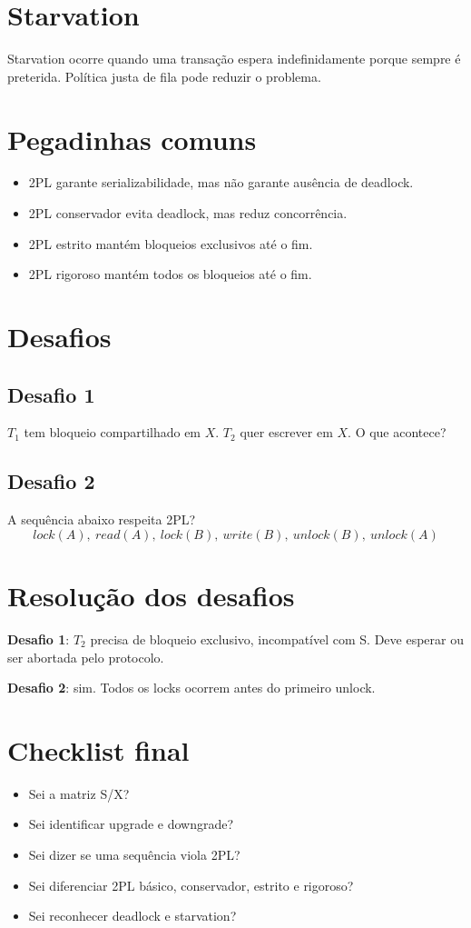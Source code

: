 \documentclass[12pt,a4paper]{article}
\begin{document}
\section{Starvation}
Starvation ocorre quando uma transação espera indefinidamente porque sempre é preterida. Política justa de fila pode reduzir o problema.

\section{Pegadinhas comuns}
\begin{itemize}
    \item 2PL garante serializabilidade, mas não garante ausência de deadlock.
    \item 2PL conservador evita deadlock, mas reduz concorrência.
    \item 2PL estrito mantém bloqueios exclusivos até o fim.
    \item 2PL rigoroso mantém todos os bloqueios até o fim.
\end{itemize}

\section{Desafios}
\subsection*{Desafio 1}
$T_1$ tem bloqueio compartilhado em $X$. $T_2$ quer escrever em $X$. O que acontece?

\subsection*{Desafio 2}
A sequência abaixo respeita 2PL?
\[
lock(A),\ read(A),\ lock(B),\ write(B),\ unlock(B),\ unlock(A)
\]

\section{Resolução dos desafios}
\textbf{Desafio 1}: $T_2$ precisa de bloqueio exclusivo, incompatível com S. Deve esperar ou ser abortada pelo protocolo.

\textbf{Desafio 2}: sim. Todos os locks ocorrem antes do primeiro unlock.

\section{Checklist final}
\begin{itemize}
    \item Sei a matriz S/X?
    \item Sei identificar upgrade e downgrade?
    \item Sei dizer se uma sequência viola 2PL?
    \item Sei diferenciar 2PL básico, conservador, estrito e rigoroso?
    \item Sei reconhecer deadlock e starvation?
\end{itemize}
\end{document}
